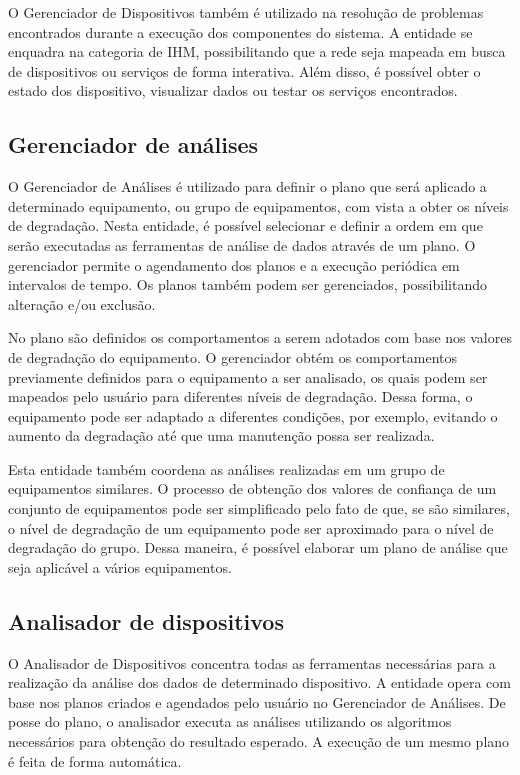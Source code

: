 O Gerenciador de Dispositivos também é utilizado na resolução de problemas encontrados durante a
execução dos componentes do sistema. A entidade se enquadra na categoria de \gls{IHM},
possibilitando que a rede seja mapeada em busca de dispositivos ou serviços de forma interativa.
Além disso, é possível obter o estado dos dispositivo, visualizar dados ou testar os serviços
encontrados.


\subsection{Gerenciador de análises}

O Gerenciador de Análises é utilizado para definir o plano que será aplicado a determinado
equipamento, ou grupo de equipamentos, com vista a obter os níveis de degradação.
Nesta entidade, é possível selecionar e definir a ordem em que serão executadas as ferramentas de
análise de dados através de um plano. O gerenciador permite o agendamento dos planos e a execução
periódica em intervalos de tempo. Os planos também podem ser gerenciados, possibilitando alteração
e/ou exclusão.

No plano são definidos os comportamentos a serem adotados com base nos valores de degradação do
equipamento. O gerenciador obtém os comportamentos previamente definidos para o equipamento a ser
analisado, os quais podem ser mapeados pelo usuário para diferentes níveis de degradação. Dessa
forma, o equipamento pode ser adaptado a diferentes condições, por exemplo, evitando o aumento da
degradação até que uma manutenção possa ser realizada.

Esta entidade também coordena as análises realizadas em um grupo de equipamentos similares. O
processo de obtenção dos valores de confiança de um conjunto de equipamentos pode ser simplificado
pelo fato de que, se são similares, o nível de degradação de um equipamento pode ser aproximado para
o nível de degradação do grupo. Dessa maneira, é possível elaborar um plano de análise que seja
aplicável a vários equipamentos.


\subsection{Analisador de dispositivos}

O Analisador de Dispositivos concentra todas as ferramentas necessárias para a realização da análise
dos dados de determinado dispositivo. A entidade opera com base nos planos criados e agendados pelo
usuário no Gerenciador de Análises. De posse do plano, o analisador
executa as análises utilizando os algoritmos necessários para obtenção do resultado esperado. A
execução de um mesmo plano é feita de forma automática.

